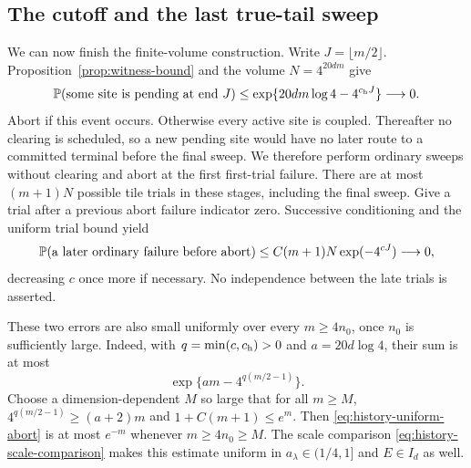 \subsection{The cutoff and the last true-tail sweep}

We can now finish the finite-volume construction.  Write
$J=\lfloor m/2\rfloor$.  Proposition~\ref{prop:witness-bound} and the
volume $N=4^{20dm}$ give
\begin{equation}
 \mathbb P(\text{some site is pending at end }J)
 \le\exp\{20dm\log4-4^{c_{\rm h}J}\}\longrightarrow0.
 \label{eq:history-cutoff}
\end{equation}
Abort if this event occurs.  Otherwise every active site is coupled.
Thereafter no clearing is scheduled, so a new pending site would have no
later route to a committed terminal before the final sweep. We therefore perform
ordinary sweeps without clearing and abort at the first first-trial failure.
There are at most $(m+1)N$ possible tile trials in
these stages, including the final sweep.  Give a trial after a previous
abort failure indicator zero.  Successive conditioning and the uniform
trial bound yield
\begin{equation}
 \mathbb P(\text{a later ordinary failure before abort})
 \le C(m+1)N\exp(-4^{cJ})\longrightarrow0,
 \label{eq:history-late-failure}
\end{equation}
decreasing $c$ once more if necessary.  No independence between the
late trials is asserted.

These two errors are also small uniformly over every $m\ge4n_0$,
once $n_0$ is sufficiently large. Indeed, with
$q=\min(c,c_{\rm h})>0$ and $a=20d\log4$, their sum is at most
\begin{equation}
 [1+C(m+1)]\exp\{am-4^{q(m/2-1)}\}.
 \label{eq:history-uniform-abort}
\end{equation}
Choose a dimension-dependent $M$ so large that for all $m\ge M$,
$4^{q(m/2-1)}\ge(a+2)m$ and $1+C(m+1)\le e^m$.
Then \eqref{eq:history-uniform-abort} is at most $e^{-m}$ whenever
$m\ge4n_0\ge M$. The scale comparison
\eqref{eq:history-scale-comparison} makes this estimate uniform in
$a_\lambda\in(1/4,1]$ and $E\in I_d$ as well.

